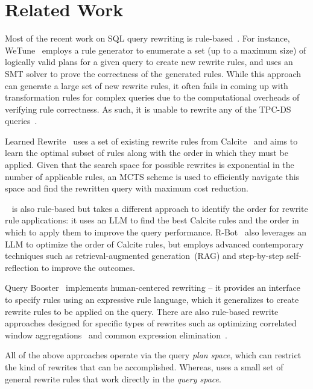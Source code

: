 \section{Related Work}
\label{sec:Related-Work}

%
Most of the recent work on SQL query rewriting is rule-based~\cite{Learned_Rewrite, Wetune, QueryBooster, FactorWindow, Fusion, Starbust}.
%
For instance, WeTune~\cite{Wetune} employs a rule generator to enumerate a set (up to a maximum size) of logically valid plans for a given query to create new rewrite rules, and uses an SMT solver to prove the correctness of the generated rules. While this approach can generate a large set of new rewrite rules, it often fails in coming up with transformation rules for complex queries due to the computational overheads of verifying rule correctness. As such, it is unable to rewrite any of the TPC-DS queries~\cite{Slabcity, Genrewrite}.

%
Learned Rewrite~\cite{Learned_Rewrite} uses a set of existing rewrite rules from Calcite~\cite{Calcite} and aims to learn the optimal subset of rules along with the order in which they must be applied. Given that the search space for possible rewrites is exponential in the number of applicable rules,
an MCTS scheme is used to efficiently navigate this space and find the rewritten query with maximum cost reduction. 

%
\llmrsq~\cite{LLMR2} is also rule-based but takes a different approach to identify the order for rewrite rule applications: it uses an LLM to find the best Calcite rules and the order in which to apply them to improve the query performance. R-Bot~\cite{rbot} also leverages an LLM to optimize the order of Calcite rules, but employs advanced contemporary techniques such as retrieval-augmented generation~(RAG) and step-by-step self-reflection to improve the outcomes. 

Query Booster~\cite{QueryBooster} implements human-centered rewriting -- it provides an interface to specify rules using an expressive rule language, which it generalizes to create rewrite rules to be applied on the query. 
%
There are also rule-based rewrite approaches designed for specific types of rewrites such as optimizing correlated window aggregations~\cite{FactorWindow} and common expression elimination~\cite{Fusion}. 

All of the above approaches operate via the query \emph{plan space}, which can restrict the kind of rewrites that can be accomplished. Whereas, \lithe uses a small set of general rewrite rules that work directly in the \emph{query space}.

